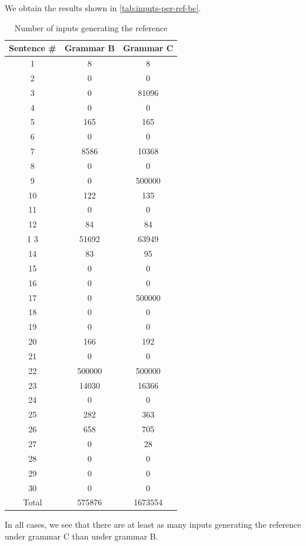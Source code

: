 \documentclass[a4paper,oneside,reqno]{amsart}
\begin{document}
\begin{enumerate}[label=\arabic*.]
    We obtain the results shown in \autoref{tab:inputs-per-ref-bc}.
    \begin{table}[H]
      \begin{tabular}{ccc}
        \toprule
        Sentence \# & Grammar B & Grammar C \\
        \midrule
        1 & 8 & 8 \\
        2 & 0 & 0 \\
        3 & 0 & 81096 \\
        4 & 0 & 0 \\
        5 & 165 & 165 \\
        6 & 0 & 0 \\
        7 & 8586 & 10368 \\
        8 & 0 & 0 \\
        9 & 0 & 500000 \\
        10 & 122 & 135 \\
        11 & 0 & 0 \\
        12 & 84 & 84 \\
        1 3 & 51692 & 63949 \\
        14 & 83 & 95 \\
        15 & 0 & 0 \\
        16 & 0 & 0 \\
        17 & 0 & 500000 \\
        18 & 0 & 0 \\
        19 & 0 & 0 \\
        20 & 166 & 192 \\
        21 & 0 & 0 \\
        22 & 500000 & 500000 \\
        23 & 14030 & 16366 \\
        24 & 0 & 0 \\
        25 & 282 & 363 \\
        26 & 658 & 705 \\
        27 & 0 & 28 \\
        28 & 0 & 0 \\
        29 & 0 & 0 \\
        30 & 0 & 0 \\
        Total & 575876 & 1673554 \\
        \bottomrule
      \end{tabular}
      \caption{Number of inputs generating the reference}
      \label{tab:inputs-per-ref-bc}
    \end{table}
    In all cases, we see that there are at least as many inputs
    generating the reference under grammar C than under grammar B.


\end{enumerate}
\end{document}
